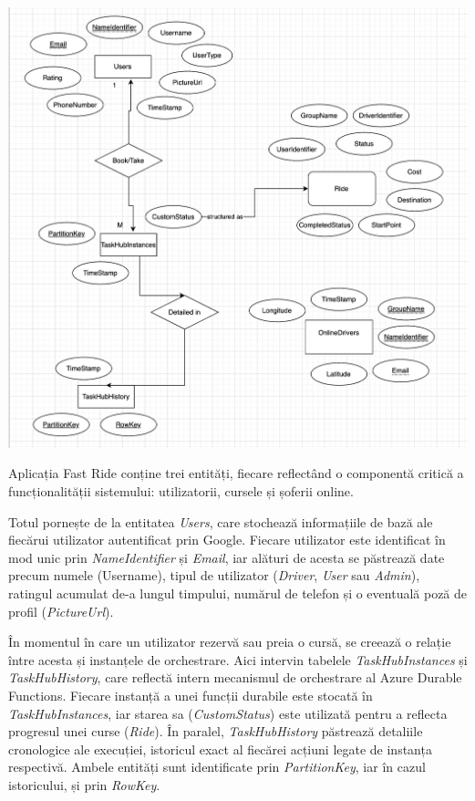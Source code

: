\includegraphics[width=14cm]{Assets/ER.png}

Aplicația Fast Ride conține trei entități, fiecare reflectând o componentă critică a 
funcționalității sistemului: utilizatorii, cursele și șoferii online.

Totul pornește de la entitatea \textit{Users}, care stochează informațiile de bază ale fiecărui utilizator autentificat prin Google.
Fiecare utilizator este identificat în mod unic prin \textit{NameIdentifier} și \textit{Email}, iar alături de acesta se păstrează date precum numele (Username), tipul de utilizator (\textit{Driver}, \textit{User} sau \textit{Admin}), ratingul acumulat de-a lungul timpului, numărul de telefon și o eventuală poză de profil (\textit{PictureUrl}).

În momentul în care un utilizator rezervă sau preia o cursă, se creează o relație între acesta și instanțele de orchestrare.
Aici intervin tabelele \textit{TaskHubInstances} și \textit{TaskHubHistory}, care reflectă intern mecanismul 
de orchestrare al Azure Durable Functions. Fiecare instanță a unei funcții durabile este stocată în \textit{TaskHubInstances}, iar starea 
sa (\textit{CustomStatus}) este utilizată pentru a reflecta progresul unei curse (\textit{Ride}). În paralel, \textit{TaskHubHistory} păstrează detaliile cronologice ale 
execuției, istoricul exact al fiecărei acțiuni legate de instanța respectivă. Ambele entități sunt identificate prin \textit{PartitionKey}, iar 
în cazul istoricului, și prin \textit{RowKey}.

